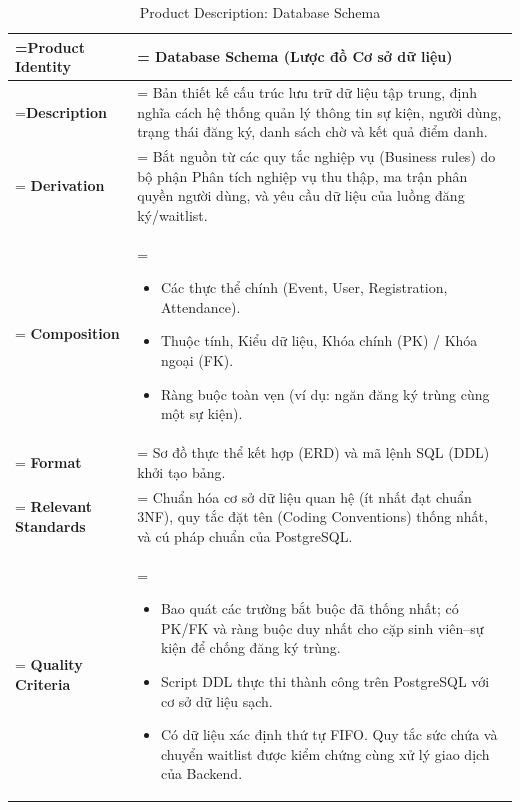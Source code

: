 \clearpage
\begin{table}[H]
    \centering
    \caption{Product Description: Database Schema}
    \renewcommand{\arraystretch}{1.5}
    \begin{tabularx}{\textwidth}{|>{\hsize=0.5\hsize\linewidth=\hsize\bfseries}X|>{\hsize=1.5\hsize\linewidth=\hsize}X|}
        \hline
        Product Identity & \textbf{Database Schema} (Lược đồ Cơ sở dữ liệu) \\
        \hline
        Description & Bản thiết kế cấu trúc lưu trữ dữ liệu tập trung, định nghĩa cách hệ thống quản lý thông tin sự kiện, người dùng, trạng thái đăng ký, danh sách chờ và kết quả điểm danh. \\
        \hline
        Derivation & Bắt nguồn từ các quy tắc nghiệp vụ (Business rules) do bộ phận Phân tích nghiệp vụ thu thập, ma trận phân quyền người dùng, và yêu cầu dữ liệu của luồng đăng ký/waitlist. \\
        \hline
        Composition & 
        \vspace{-0.8em}
        \begin{itemize}[leftmargin=*, nosep]
            \item Các thực thể chính (Event, User, Registration, Attendance).
            \item Thuộc tính, Kiểu dữ liệu, Khóa chính (PK) / Khóa ngoại (FK).
            \item Ràng buộc toàn vẹn (ví dụ: ngăn đăng ký trùng cùng một sự kiện).
        \end{itemize}
        \vspace{-1em} \\
        \hline
        Format & Sơ đồ thực thể kết hợp (ERD) và mã lệnh SQL (DDL) khởi tạo bảng. \\
        \hline
        Relevant Standards & Chuẩn hóa cơ sở dữ liệu quan hệ (ít nhất đạt chuẩn 3NF), quy tắc đặt tên (Coding Conventions) thống nhất, và cú pháp chuẩn của PostgreSQL. \\
        \hline
        Quality Criteria & 
        \vspace{-0.8em}
        \begin{itemize}[leftmargin=*, nosep]
            \item Bao quát các trường bắt buộc đã thống nhất; có PK/FK và ràng buộc duy nhất cho cặp sinh viên--sự kiện để chống đăng ký trùng.
            \item Script DDL thực thi thành công trên PostgreSQL với cơ sở dữ liệu sạch.
            \item Có dữ liệu xác định thứ tự FIFO. Quy tắc sức chứa và chuyển waitlist được kiểm chứng cùng xử lý giao dịch của Backend.
        \end{itemize}
        \vspace{-1em} \\
        \hline
    \end{tabularx}
\end{table}

